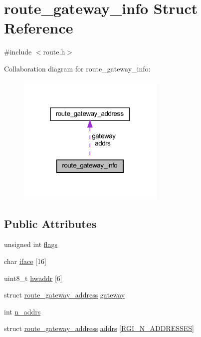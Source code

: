 \hypertarget{structroute__gateway__info}{}\section{route\+\_\+gateway\+\_\+info Struct Reference}
\label{structroute__gateway__info}


{\ttfamily \#include $<$route.\+h$>$}



Collaboration diagram for route\+\_\+gateway\+\_\+info\+:
\nopagebreak
\begin{figure}[H]
\begin{center}
\leavevmode
\includegraphics[width=199pt]{structroute__gateway__info__coll__graph}
\end{center}
\end{figure}
\subsection*{Public Attributes}
\begin{DoxyCompactItemize}
\item 
unsigned int \hyperlink{structroute__gateway__info_a28486a8aae1940b41d6969c926446820}{flags}
\item 
char \hyperlink{structroute__gateway__info_aaf17695926fe4ba822c86256742f005b}{iface} \mbox{[}16\mbox{]}
\item 
uint8\+\_\+t \hyperlink{structroute__gateway__info_a085f4be76e2215ac99ab2a7651513f8e}{hwaddr} \mbox{[}6\mbox{]}
\item 
struct \hyperlink{structroute__gateway__address}{route\+\_\+gateway\+\_\+address} \hyperlink{structroute__gateway__info_ab9e341920923382cc32079487eca6e62}{gateway}
\item 
int \hyperlink{structroute__gateway__info_ac2f1688b2f4f2544b1c75a6028714579}{n\+\_\+addrs}
\item 
struct \hyperlink{structroute__gateway__address}{route\+\_\+gateway\+\_\+address} \hyperlink{structroute__gateway__info_a821e9fd19ddaef85c9c5728d68429029}{addrs} \mbox{[}\hyperlink{route_8h_aba3fd1599b860046600710d7b1f6f82b}{R\+G\+I\+\_\+\+N\+\_\+\+A\+D\+D\+R\+E\+S\+S\+E\+S}\mbox{]}
\end{DoxyCompactItemize}


